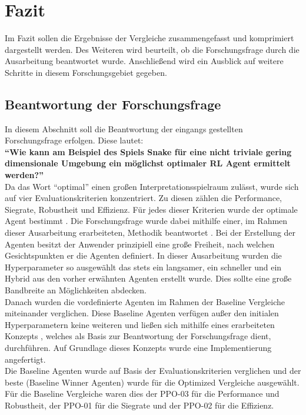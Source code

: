 \chapter{Fazit}
Im Fazit sollen die Ergebnisse der Vergleiche  zusammengefasst und komprimiert dargestellt werden. Des Weiteren wird beurteilt, ob die Forschungsfrage  durch die Ausarbeitung beantwortet wurde.
Anschließend wird ein Ausblick auf weitere Schritte in diesem Forschungsgebiet gegeben.

\section{Beantwortung der Forschungsfrage}
In diesem Abschnitt soll die Beantwortung der eingangs gestellten Forschungsfrage erfolgen. Diese lautet:\\
\textbf{"`Wie kann am Beispiel des Spiels Snake für eine nicht triviale gering dimensionale Umgebung ein möglichst optimaler RL Agent ermittelt werden?"'}\\
Da das Wort "`optimal"' einen großen Interpretationsspielraum zulässt, wurde sich auf vier Evaluationskriterien konzentriert. Zu diesen zählen die Performance, Siegrate, Robustheit und Effizienz. Für jedes dieser Kriterien wurde der optimale Agent bestimmt .
Die Forschungsfrage wurde dabei mithilfe einer, im Rahmen dieser Ausarbeitung erarbeiteten, Methodik beantwortet .
Bei der Erstellung der Agenten besitzt der Anwender prinzipiell eine große Freiheit, nach welchen Gesichtspunkten er die Agenten definiert. In dieser Ausarbeitung wurden die Hyperparameter so ausgewählt das stets ein langsamer, ein schneller und ein Hybrid aus den vorher erwähnten Agenten erstellt wurde. Dies sollte eine große Bandbreite an Möglichkeiten abdecken.\\
Danach wurden die vordefinierte Agenten im Rahmen der Baseline Vergleiche miteinander verglichen. Diese Baseline Agenten verfügen außer den initialen Hyperparametern keine weiteren und ließen sich mithilfe eines erarbeiteten Konzepts , welches als Basis zur Beantwortung der Forschungsfrage dient, durchführen. Auf Grundlage dieses Konzepts wurde eine Implementierung  angefertigt.\\
Die Baseline Agenten wurde auf Basis der Evaluationskriterien verglichen und der beste (Baseline Winner Agenten) wurde für die Optimized Vergleiche ausgewählt. Für die Baseline Vergleiche waren dies der PPO-03 für die Performance und Robustheit, der PPO-01 für die Siegrate und der PPO-02 für die Effizienz.\\
